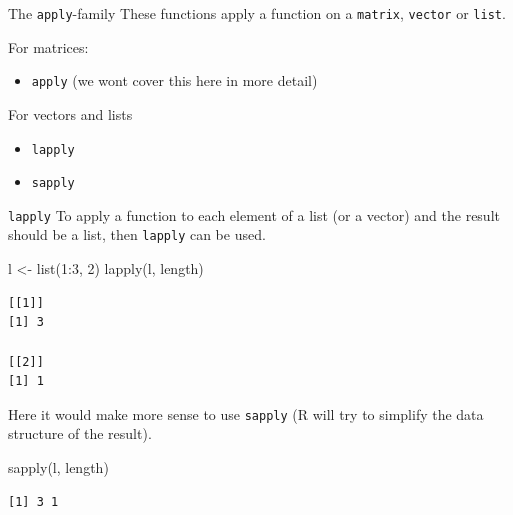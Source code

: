 \documentclass[ignorenonframetext,,t]{beamer}
\providecommand{\tightlist}{%
\setlength{\itemsep}{0pt}\setlength{\parskip}{0pt}}
\newenvironment{Shaded}{\begin{snugshade}}{\end{snugshade}}
\newcommand{\DecValTok}[1]{\textcolor[rgb]{0.00,0.00,0.81}{#1}}
\newcommand{\FunctionTok}[1]{\textcolor[rgb]{0.00,0.00,0.00}{#1}}
\newcommand{\NormalTok}[1]{#1}
\newcommand{\OtherTok}[1]{\textcolor[rgb]{0.56,0.35,0.01}{#1}}
\newcommand{\SpecialCharTok}[1]{\textcolor[rgb]{0.00,0.00,0.00}{#1}}
\providecommand{\tightlist}{%
\setlength{\itemsep}{0pt}\setlength{\parskip}{0pt}}
\renewcommand{\tightlist}{\setlength{\itemsep}{1.4ex}\setlength{\parskip}{0pt}}
\begin{document}
\begin{frame}[fragile]
\begin{block}{The \texttt{apply}-family}
\protect\hypertarget{the-apply-family}{}
These functions apply a function on a \texttt{matrix}, \texttt{vector}
or \texttt{list}.

For matrices:

\begin{itemize}
\tightlist
\item
  \texttt{apply} (we wont cover this here in more detail)
\end{itemize}

For vectors and lists

\begin{itemize}
\tightlist
\item
  \texttt{lapply}
\item
  \texttt{sapply}
\end{itemize}
\end{block}
\end{frame}

\begin{frame}[fragile]
\begin{block}{\texttt{lapply}}
\protect\hypertarget{lapply}{}
To apply a function to each element of a list (or a vector) and the
result should be a list, then \texttt{lapply} can be used.

\begin{Shaded}
\begin{Highlighting}[]
\NormalTok{l }\OtherTok{\textless{}{-}} \FunctionTok{list}\NormalTok{(}\DecValTok{1}\SpecialCharTok{:}\DecValTok{3}\NormalTok{, }\DecValTok{2}\NormalTok{)}
\FunctionTok{lapply}\NormalTok{(l, length)}
\end{Highlighting}
\end{Shaded}

\begin{verbatim}
[[1]]
[1] 3

[[2]]
[1] 1
\end{verbatim}
\end{block}
\end{frame}

\begin{frame}[fragile]
Here it would make more sense to use \texttt{sapply} (R will try to
simplify the data structure of the result).

\begin{Shaded}
\begin{Highlighting}[]
\FunctionTok{sapply}\NormalTok{(l, length)}
\end{Highlighting}
\end{Shaded}

\begin{verbatim}
[1] 3 1
\end{verbatim}
\end{frame}
\end{document}
